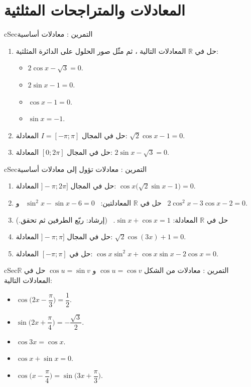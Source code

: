 \documentclass[12pt,a4paper]{article}
\newenvironment{BOX}[2]{\begin{otherlanguage}{english}\begin{arbox}{#1}{#2}}{\end{arbox}\end{otherlanguage}}
\newcounter{exo}
\newenvironment{tamrin}[1]{\stepcounter{exo}\begin{BOX}{cSec}{التمرين \theexo: #1}}{\end{BOX}}
\newcommand{\R}{\mathbb{R}}
\newenvironment{sq}{\begin{itemize}[leftmargin=2.4em,itemsep=3pt]}{\end{itemize}}
\newcommand{\qa}{\item[(أ)]}\newcommand{\qb}{\item[(ب)]}\newcommand{\qc}{\item[(جـ)]}\newcommand{\qd}{\item[(د)]}\newcommand{\qe}{\item[(هـ)]}
\begin{document}
\section{المعادلات والمتراجحات المثلثية}
\begin{tamrin}{معادلات أساسية}
\begin{enumerate}
\item حل في $\R$ المعادلات التالية ، ثم مثّل صور الحلول على الدائرة المثلثية:
\begin{sq}
\qa $2\cos x-\sqrt3=0$.
\qb $2\sin x-1=0$.
\qc $\cos x-1=0$.
\qd $\sin x=-1$.
\end{sq}
\item حل في المجال $I=[-\pi;\pi]$ المعادلة: $\sqrt2\cos x-1=0$.
\item حل في المجال $[0;2\pi]$ المعادلة: $2\sin x-\sqrt3=0$.
\end{enumerate}
\end{tamrin}

\begin{tamrin}{معادلات تؤول إلى معادلات أساسية}
\begin{enumerate}
\item حل في المجال $]-\pi;2\pi]$ المعادلة: $\cos x\big(\sqrt2\sin x-1\big)=0$.
\item حل في $\R$ المعادلتين: \ $\sin^2x-\sin x-6=0$ \ و \ $2\cos^2x-3\cos x-2=0$.
\item حل في $\R$ المعادلة: $\sin x+\cos x=1$. \ (إرشاد: ربّع الطرفين ثم تحقق.)
\item حل في المجال $]-\pi;\pi]$ المعادلة: $\sqrt2\cos(3x)+1=0$.
\item حل في $[-\pi;\pi]$ المعادلة: $\cos x\sin^2x+\cos x\sin x-2\cos x=0$.
\end{enumerate}
\end{tamrin}

\begin{tamrin}{معادلات من الشكل $\cos u=\cos v$ و $\cos u=\sin v$}
حل في $\R$ المعادلات التالية:
\begin{sq}
\qa $\cos\Big(2x-\dfrac{\pi}{3}\Big)=\dfrac12$.
\qb $\sin\Big(2x+\dfrac{\pi}{4}\Big)=-\dfrac{\sqrt3}{2}$.
\qc $\cos3x=\cos x$.
\qd $\cos x+\sin x=0$.
\qe $\cos\Big(x-\dfrac{\pi}{4}\Big)=\sin\Big(3x+\dfrac{\pi}{3}\Big)$.
\end{sq}
\end{tamrin}
\end{document}
